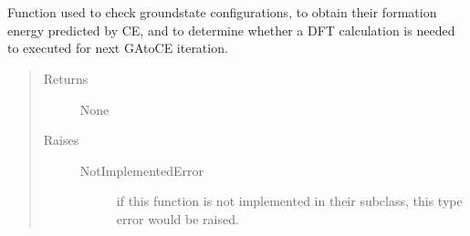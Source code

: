 \documentclass[letterpaper,10pt,english]{sphinxmanual}
\begin{document}
\begin{fulllineitems}
\begin{quote}
\begin{description}
\begin{description}
\end{description}

\end{description}\end{quote}

\begin{fulllineitems}
\label{\detokenize{pygace:pygace.gace.AbstractRunner.app}}~
\end{fulllineitems}


\begin{fulllineitems}
\label{\detokenize{pygace:pygace.gace.AbstractRunner.iter_idx}}~
\end{fulllineitems}


\begin{fulllineitems}
\label{\detokenize{pygace:pygace.gace.AbstractRunner.print_gs}}
\sphinxAtStartPar
Function used to check ground\sphinxhyphen{}state configurations, to obtain their
formation energy predicted by CE, and to determine whether a DFT
calculation is needed to executed for next GA\sphinxhyphen{}to\sphinxhyphen{}CE iteration.
\begin{quote}\begin{description}
\item[{Returns}] \leavevmode\begin{description}
\item[{None}] \leavevmode
\end{description}

\item[{Raises}] \leavevmode\begin{description}
\item[{NotImplementedError}] \leavevmode
\sphinxAtStartPar
if this function is not implemented in their subclass, this type
error would be raised.

\end{description}


\end{description}
\end{quote}
\end{fulllineitems}
\end{fulllineitems}
\end{document}
